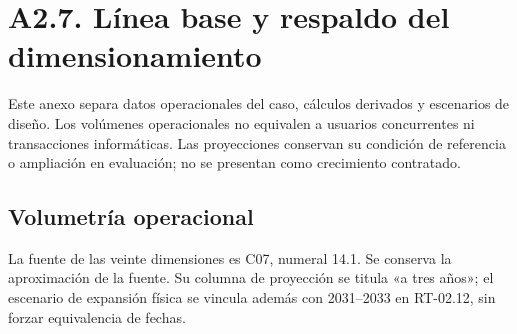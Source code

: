 \section*{A2.7. Línea base y respaldo del dimensionamiento}
Este anexo separa datos operacionales del caso, cálculos derivados y escenarios de diseño. Los volúmenes operacionales no equivalen a usuarios concurrentes ni transacciones informáticas. Las proyecciones conservan su condición de referencia o ampliación en evaluación; no se presentan como crecimiento contratado.

\subsection*{Volumetría operacional}
La fuente de las veinte dimensiones es C07, numeral 14.1. Se conserva la aproximación de la fuente. Su columna de proyección se titula «a tres años»; el escenario de expansión física se vincula además con 2031–2033 en RT-02.12, sin forzar equivalencia de fechas.

